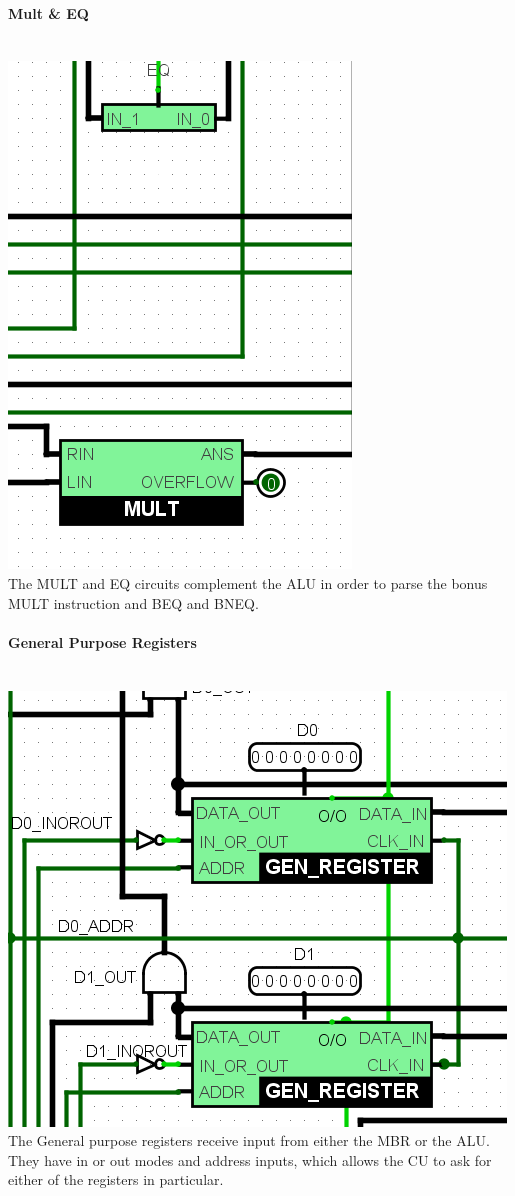 \documentclass{mcgillhomework}
\begin{document}
	\paragraph{Mult \& EQ}~
	\\ \includegraphics[scale=0.5]{MEQ}\\ The MULT and EQ circuits complement the ALU in order to parse the bonus MULT instruction and BEQ and BNEQ.
	\paragraph{General Purpose Registers}~
	\\ \includegraphics[scale=0.5]{DR}\\The General purpose registers receive input from either the MBR or the ALU. They have in or out modes and address inputs, which allows the CU to ask for either of the registers in particular.
\end{document}
